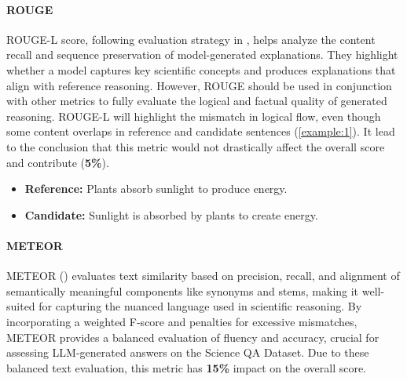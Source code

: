 \documentclass{article}
\begin{document}
\paragraph{ROUGE}
ROUGE-L score, following evaluation strategy in \cite{lu2022learn}, helps analyze the content recall and sequence preservation of model-generated explanations. They highlight whether a model captures key scientific concepts and produces explanations that align with reference reasoning. However, ROUGE should be used in conjunction with other metrics to fully evaluate the logical and factual quality of generated reasoning. ROUGE-L will highlight the mismatch in logical flow, even though some content overlaps in reference and candidate sentences (\ref{example:1}). It lead to the conclusion that this metric would not drastically affect the overall score and contribute (\textbf{5\%}).

\label{example:1}
\begin{itemize}
    \item \textbf{Reference:} Plants absorb sunlight to produce energy.
    \item \textbf{Candidate:} Sunlight is absorbed by plants to create energy.
\end{itemize}

\paragraph{METEOR}
METEOR (\cite{banerjee2005meteor}) evaluates text similarity based on precision, recall, and alignment of semantically meaningful components like synonyms and stems, making it well-suited for capturing the nuanced language used in scientific reasoning.
By incorporating a weighted F-score and penalties for excessive mismatches, METEOR provides a balanced evaluation of fluency and accuracy, crucial for assessing LLM-generated answers on the Science QA Dataset. Due to these balanced text evaluation, this metric has \textbf{15\%} impact on the overall score.
\end{document}
